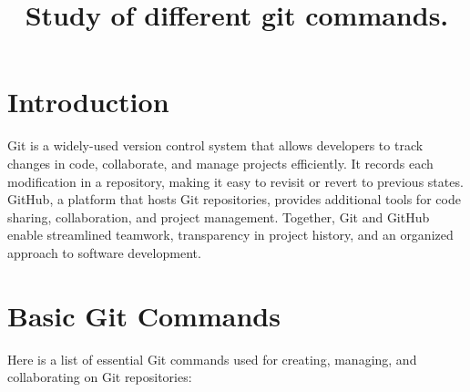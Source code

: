 \documentclass[12pt]{article}
\title{Study of different git commands.}
\author{}
\date{}
\begin{document}


\maketitle
\section*{Introduction}
Git is a widely-used version control system that allows developers to track changes in code, collaborate, and manage projects efficiently. It records each modification in a repository, making it easy to revisit or revert to previous states. GitHub, a platform that hosts Git repositories, provides additional tools for code sharing, collaboration, and project management. Together, Git and GitHub enable streamlined teamwork, transparency in project history, and an organized approach to software development.

\section*{Basic Git Commands}
Here is a list of essential Git commands used for creating, managing, and collaborating on Git repositories:
\end{document}

